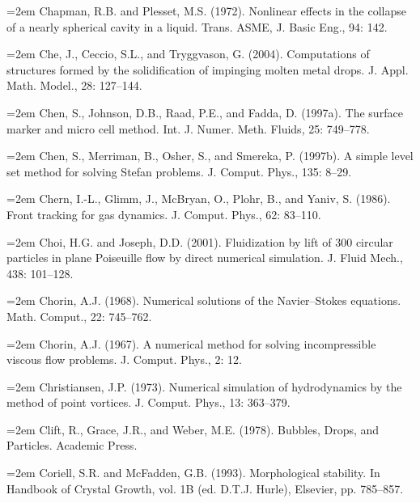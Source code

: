 \documentclass[11pt,a4paper,openany,fontset=none]{ctexbook}
\begin{document}
\par\hangindent=2em Chapman, R.B. and Plesset, M.S. (1972). Nonlinear effects in the collapse of a nearly spherical cavity in a liquid. Trans. ASME, J. Basic Eng., 94: 142.

\par\hangindent=2em Che, J., Ceccio, S.L., and Tryggvason, G. (2004). Computations of structures formed by the solidification of impinging molten metal drops. J. Appl. Math. Model., 28: 127--144.

\par\hangindent=2em Chen, S., Johnson, D.B., Raad, P.E., and Fadda, D. (1997a). The surface marker and micro cell method. Int. J. Numer. Meth. Fluids, 25: 749--778.

\par\hangindent=2em Chen, S., Merriman, B., Osher, S., and Smereka, P. (1997b). A simple level set method for solving Stefan problems. J. Comput. Phys., 135: 8--29.

\par\hangindent=2em Chern, I.-L., Glimm, J., McBryan, O., Plohr, B., and Yaniv, S. (1986). Front tracking for gas dynamics. J. Comput. Phys., 62: 83--110.

\par\hangindent=2em Choi, H.G. and Joseph, D.D. (2001). Fluidization by lift of 300 circular particles in plane Poiseuille flow by direct numerical simulation. J. Fluid Mech., 438: 101--128.

\par\hangindent=2em Chorin, A.J. (1968). Numerical solutions of the Navier--Stokes equations. Math. Comput., 22: 745--762.

\par\hangindent=2em Chorin, A.J. (1967). A numerical method for solving incompressible viscous flow problems. J. Comput. Phys., 2: 12.

\par\hangindent=2em Christiansen, J.P. (1973). Numerical simulation of hydrodynamics by the method of point vortices. J. Comput. Phys., 13: 363--379.

\par\hangindent=2em Clift, R., Grace, J.R., and Weber, M.E. (1978). Bubbles, Drops, and Particles. Academic Press.

\par\hangindent=2em Coriell, S.R. and McFadden, G.B. (1993). Morphological stability. In Handbook of Crystal Growth, vol. 1B (ed. D.T.J. Hurle), Elsevier, pp. 785--857.
\end{document}
